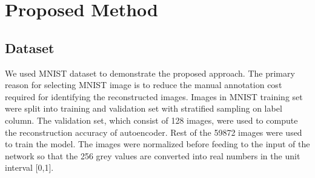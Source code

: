 \documentclass{uai2021} %
\begin{document}
\section{Proposed Method} \label{proposed_method}
\subsection{Dataset}
We used MNIST dataset\cite{mnist} to demonstrate the proposed approach.
The primary reason for selecting MNIST image is to reduce the manual annotation cost required for identifying the reconstructed images.
Images in MNIST training set were split into training and validation set with stratified sampling on label column.
The validation set, which consist of 128 images, were used to compute the reconstruction accuracy of autoencoder.
Rest of the 59872 images were used to train the model.
The images were normalized  before feeding to the input of the network so that the 256 grey values are converted into real numbers in the unit interval [0,1].
\end{document}
